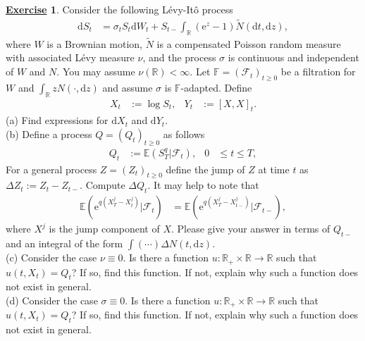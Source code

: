 \documentclass[12pt]{book}
\numberwithin{equation}{chapter}
\theoremstyle{plain}
\numberwithin{theorem}{section}
\theoremstyle{definition}
\newtheorem{exercise}{\underline{Exercise}}
\numberwithin{exercise}{chapter}
\newcommand{\<}{\langle}
\renewcommand{\>}{\rangle}
\renewcommand{\(}{\left(}
\renewcommand{\)}{\right)}
\renewcommand{\[}{\left[}
\renewcommand{\]}{\right]}
\newcommand\Eb{\mathds{E}}
\newcommand\Fb{\mathds{F}}
\newcommand\Rb{\mathds{R}}
\newcommand\Fc{\mathscr{F}}
\newcommand\sig{\sigma}
\newcommand\Del{\Delta}
\newcommand\Nt{\widetilde{N}}
\newcommand\dd{\mathrm{d}}
\newcommand\ee{\mathrm{e}}
\begin{document}
\begin{exercise}
\label{exer:10.10}
Consider the following L\'evy-It\^o process
\begin{align}
\dd S_t
	&=	\sig_t S_t \dd W_t + S_{t-} \int_\Rb (\ee^z - 1 ) \Nt(\dd t, \dd z) ,
\end{align}
where $W$ is a Brownian motion, $\Nt$ is a compensated Poisson random measure with associated L\'evy measure $\nu$, and the process $\sig$ is continuous and independent of $W$ and $N$.  You may assume $\nu(\Rb)<\infty$.
Let $\Fb = (\Fc_t)_{t \geq 0}$ be a filtration for $W$ and $\int_\Rb z N( \cdot , \dd z)$ and assume $\sig$ is $\Fb$-adapted.  Define
\begin{align}
X_t
	&:=	\log S_t , &
Y_t
	&:=	[X,X]_t .
\end{align}
(a) Find expressions for $\dd X_t$ and $\dd Y_t$.
\\[0.5em]
(b) Define a process $Q = (Q_t)_{t \geq 0}$ as follows
\begin{align}
Q_t
	&:=	\Eb( S_T^q | \Fc_t ) , &
0
	&\leq t \leq T ,
\end{align}
For a general process $Z = (Z_t)_{t \geq 0}$ define the jump of $Z$ at time $t$ as $\Del Z_t := Z_t - Z_{t-}$.
Compute $\Del Q_t$.  It may help to note that
\begin{align}
\Eb( \ee^{q (X_T^j -  X_{t}^j)} | \Fc_{t} )
	&=	\Eb( \ee^{q (X_T^j -  X_{t-}^j)} | \Fc_{t-} ) ,
\end{align}
where $X^j$ is the jump component of $X$.
Please give your answer in terms of $Q_{t-}$ and an integral of the form $\int (\cdots ) \Del N(t, \dd z)$.
\\[0.5em]
(c) Consider the case $\nu \equiv 0$.  Is there a function $u : \Rb_+ \times \Rb \to \Rb$ such that $u(t,X_t) = Q_t$?  If so, find this function.  If not, explain why such a function does not exist in general.
\\[0.5em]
(d) Consider the case $\sig \equiv 0$.  Is there a function $u : \Rb_+ \times \Rb \to \Rb$ such that $u(t,X_t) = Q_t$?  If so, find this function.  If not, explain why such a function does not exist in general.
\end{exercise}
\end{document}
